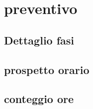 	\section{preventivo}
	    \subsection{Dettaglio fasi}
		\subsection{prospetto orario}
		\subsection{conteggio ore}